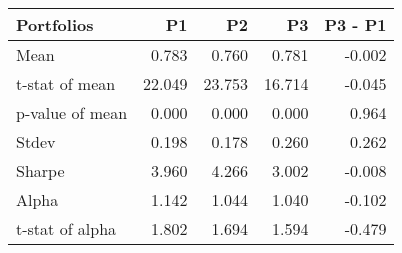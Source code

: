 \begin{tabular}{lrrrr}
\toprule
Portfolios & P1 & P2 & P3 & P3 - P1 \\
\midrule
Mean & 0.783 & 0.760 & 0.781 & -0.002 \\
t-stat of mean & 22.049 & 23.753 & 16.714 & -0.045 \\
p-value of mean & 0.000 & 0.000 & 0.000 & 0.964 \\
Stdev & 0.198 & 0.178 & 0.260 & 0.262 \\
Sharpe & 3.960 & 4.266 & 3.002 & -0.008 \\
Alpha & 1.142 & 1.044 & 1.040 & -0.102 \\
t-stat of alpha & 1.802 & 1.694 & 1.594 & -0.479 \\
\bottomrule
\end{tabular}

